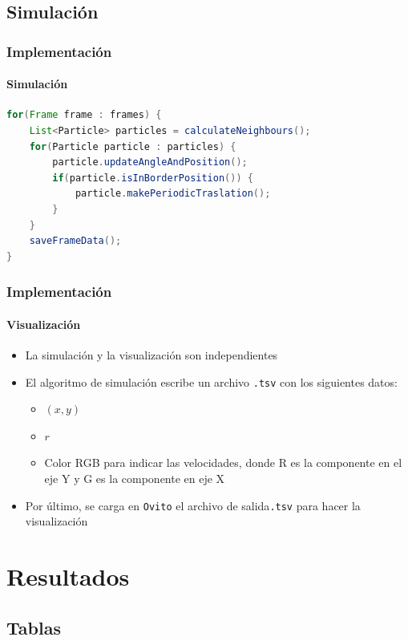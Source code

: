 \documentclass[hyperref={pdfpagelayout=SinglePage}]{beamer}
\begin{document}
\subsection{Simulación}

\begin{frame}[fragile]
\frametitle{Implementación}
\framesubtitle{Simulación}
\begin{lstlisting}[language=Java, caption = Algoritmo de simulación de partículas.]
for(Frame frame : frames) {
	List<Particle> particles = calculateNeighbours();
	for(Particle particle : particles) {
		particle.updateAngleAndPosition();
		if(particle.isInBorderPosition()) {
			particle.makePeriodicTraslation();
		}
	}
	saveFrameData();
}
\end{lstlisting}
\end{frame}

\begin{frame}
\frametitle{Implementación}
\framesubtitle{Visualización}
\begin{itemize}
	\item La simulación y la visualización son independientes
	\item El algoritmo de simulación escribe un archivo \texttt{.tsv} con los siguientes datos:
\begin{itemize}
\item $(x,y)$
\item $r$
\item Color RGB para indicar las velocidades, donde R es la componente en el eje Y y G es la componente en eje X
\end{itemize}
\item Por último, se carga en \texttt{Ovito} el archivo de salida\texttt{.tsv} para hacer la visualización
\end{itemize}
\end{frame}

\section{Resultados}

\subsection{Tablas}
\end{document}
